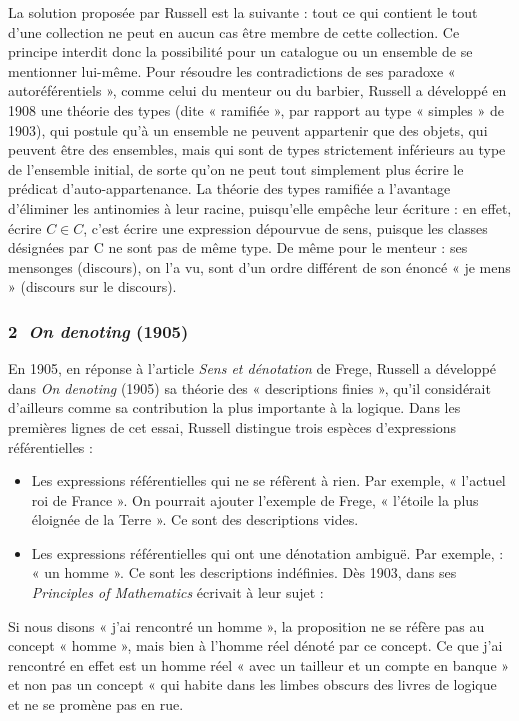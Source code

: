 La solution proposée par Russell est la suivante : tout ce qui contient le tout d’une collection ne peut en aucun cas être membre de cette collection. Ce principe interdit donc la possibilité pour un catalogue ou un ensemble de se mentionner lui-même. Pour résoudre les contradictions de ses paradoxe « autoréférentiels », comme celui du menteur ou du barbier, Russell a développé en 1908 une théorie des types (dite « ramifiée », par rapport au type « simples » de 1903), qui postule qu’à un ensemble ne peuvent appartenir que des objets, qui peuvent être des ensembles, mais qui sont de types strictement inférieurs au type de l’ensemble initial, de sorte qu’on ne peut tout simplement plus écrire le prédicat d’auto-appartenance. La théorie des types ramifiée a l’avantage d’éliminer les antinomies à leur racine, puisqu’elle empêche leur écriture : en effet, écrire $C\in C$, c’est écrire une expression dépourvue de sens, puisque les classes désignées par C ne sont pas de même type. De même pour le menteur : ses mensonges (discours), on l’a vu, sont d’un ordre différent de son énoncé « je mens » (discours sur le discours).

\subsubsection*{\textcircled{\scriptsize 2} \textit{On denoting} (1905)}
En 1905, en réponse à l’article \textit{Sens et dénotation} de Frege, Russell a développé dans \textit{On denoting} (1905) sa théorie des « descriptions finies », qu’il considérait d’ailleurs comme sa contribution la plus importante à la logique. Dans les premières lignes de cet essai, Russell distingue trois espèces d’expressions référentielles :
\begin{itemize}
\item Les expressions référentielles qui ne se réfèrent à rien. Par exemple, « l’actuel roi de France ». On pourrait ajouter l’exemple de Frege, « l’étoile la plus éloignée de la Terre ». Ce sont des descriptions vides.
\item Les expressions référentielles qui ont une dénotation ambiguë. Par exemple, : « un homme ». Ce sont les descriptions indéfinies. Dès 1903, dans ses \textit{Principles of Mathematics} écrivait à leur sujet :
\end{itemize}

\begin{lecture}{}
Si nous disons « j’ai rencontré un homme », la proposition ne se réfère pas au concept « homme », mais bien à l’homme réel dénoté par ce concept. Ce que j’ai rencontré en effet est un homme réel « avec un tailleur et un compte en banque » et non pas un concept « qui habite dans les limbes obscurs des livres de logique et ne se promène pas en rue.
\end{lecture}

